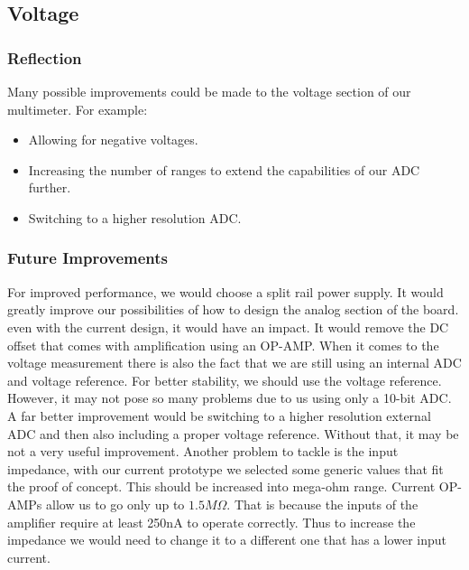 \subsection{Voltage}
\label{sec:discussion_voltage}

\subsubsection{Reflection}
Many possible improvements could be made to the voltage section of our multimeter.
For example:
\begin{itemize}
    \item Allowing for negative voltages.
    \item Increasing the number of ranges to extend the capabilities of our ADC further.
    \item Switching to a higher resolution ADC.
\end{itemize}

\subsubsection{Future Improvements}
For improved performance, we would choose a split rail power supply.
It would greatly improve our possibilities of how to design the analog section of the board. even with the current design, it would have an impact. It would remove the DC offset that comes with amplification using an OP-AMP. When it comes to the voltage measurement there is also the fact that we are still using an internal ADC and voltage reference. For better stability, we should use the voltage reference. However, it may not pose so many problems due to us using only a 10-bit ADC. A far better improvement would be switching to a higher resolution external ADC and then also including a proper voltage reference. Without that, it may be not a very useful improvement. Another problem to tackle is the input impedance, with our current prototype we selected some generic values that fit the proof of concept. This should be increased into mega-ohm range. Current OP-AMPs allow us to go only up to $1.5M\Omega$. That is because the inputs of the amplifier require at least 250nA to operate correctly. Thus to increase the impedance we would need to change it to a different one that has a lower input current.